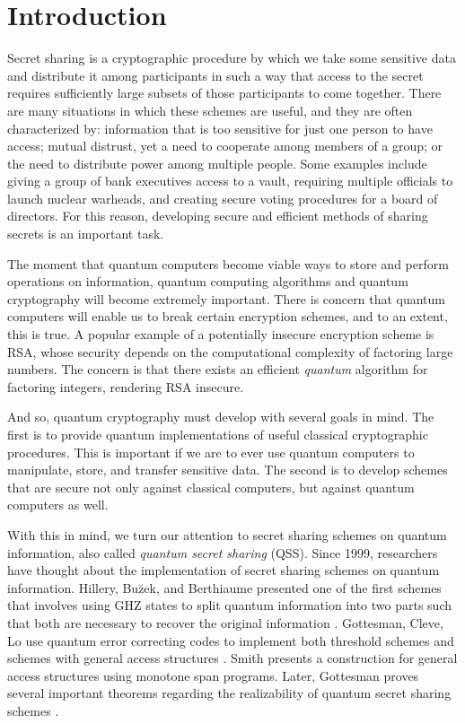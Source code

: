 \chapter*{Introduction}
\label{introduction}

Secret sharing is a cryptographic procedure by which we take some sensitive data and distribute it among participants in such a way that access to the secret requires sufficiently large subsets of those participants to come together. There are many situations in which these schemes are useful, and they are often characterized by: information that is too sensitive for just one person to have access; mutual distrust, yet a need to cooperate among members of a group; or the need to distribute power among multiple people. Some examples include giving a group of bank executives access to a vault, requiring multiple officials to launch nuclear warheads, and creating secure voting procedures for a board of directors. For this reason, developing secure and efficient methods of sharing secrets is an important task. 

The moment that quantum computers become viable ways to store and perform operations on information, quantum computing algorithms and quantum cryptography will become extremely important. There is concern that quantum computers will enable us to break certain encryption schemes, and to an extent, this is true. A popular example of a potentially insecure encryption scheme is RSA, whose security depends on the computational complexity of factoring large numbers. The concern is that there exists an efficient \textit{quantum} algorithm for factoring integers, rendering RSA insecure.

And so, quantum cryptography must develop with several goals in mind. The first is to provide quantum implementations of useful classical cryptographic procedures. This is important if we are to ever use quantum computers to manipulate, store, and transfer sensitive data. The second is to develop schemes that are secure not only against classical computers, but against quantum computers as well.

With this in mind, we turn our attention to secret sharing schemes on quantum information, also called \textit{quantum secret sharing} (QSS). Since 1999, researchers have thought about the implementation of secret sharing schemes on quantum information. Hillery, Bu\u{z}ek, and Berthiaume presented one of the first schemes that involves using GHZ states to split quantum information into two parts such that both are necessary to recover the original information \cite{Hillery_1999}. Gottesman, Cleve, Lo use quantum error correcting codes to implement both threshold schemes and schemes with general access structures \cite{Cleve_1999}. Smith presents a construction for general access structures using monotone span programs. Later, Gottesman proves several important theorems regarding the realizability of quantum secret sharing schemes \cite{singh_assisted_2004}.

